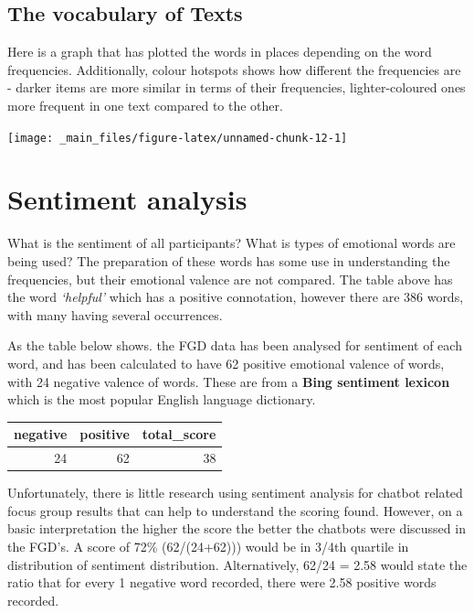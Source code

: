 \documentclass[a4paper, nobind]{templates/ociamthesis}
\begin{document}
\hypertarget{the-vocabulary-of-texts}{%
\subsection{The vocabulary of Texts}\label{the-vocabulary-of-texts}}

Here is a graph that has plotted the words in places depending on the
word frequencies. Additionally, colour hotspots shows how different the
frequencies are - darker items are more similar in terms of their
frequencies, lighter-coloured ones more frequent in one text compared to
the other.

\begin{flushleft}\texttt{[image: \_main\_files/figure-latex/unnamed-chunk-12-1]} \end{flushleft}

\hypertarget{sentiment-analysis}{%
\section{Sentiment analysis}\label{sentiment-analysis}}

What is the sentiment of all participants? What is types of emotional
words are being used? The preparation of these words has some use in
understanding the frequencies, but their emotional valence are not
compared. The table above has the word \emph{`helpful'} which has a positive
connotation, however there are 386 words, with many having several
occurrences.

As the table below shows. the FGD data has been analysed for sentiment
of each word, and has been calculated to have 62 positive emotional
valence of words, with 24 negative valence of words. These are from a
\textbf{Bing sentiment lexicon} which is the most popular English language
dictionary.

\begin{tabular}{r|r|r}
\hline
negative & positive & total\_score\\
\hline
24 & 62 & 38\\
\hline
\end{tabular}

Unfortunately, there is little research using sentiment analysis for
chatbot related focus group results that can help to understand the
scoring found. However, on a basic interpretation the higher the score
the better the chatbots were discussed in the FGD's. A score of 72\%
(62/(24+62))) would be in 3/4th quartile in distribution of sentiment
distribution. Alternatively, 62/24 = 2.58 would state the ratio that for
every 1 negative word recorded, there were 2.58 positive words recorded.
\end{document}
